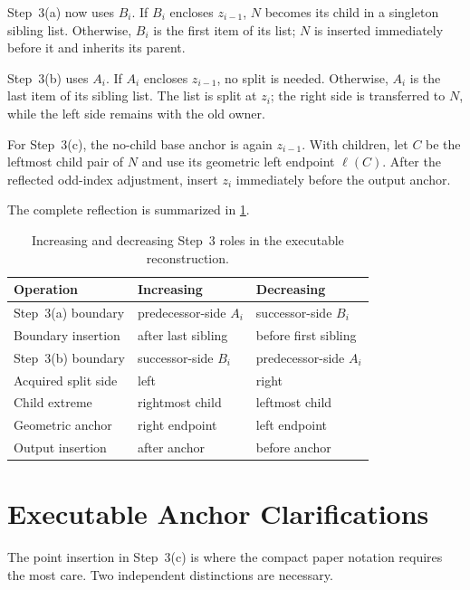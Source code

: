 Step~3(a) now uses $B_i$. If $B_i$ encloses $z_{i-1}$, $N$ becomes its child
in a singleton sibling list. Otherwise, $B_i$ is the first item of its list;
$N$ is inserted immediately before it and inherits its parent.

Step~3(b) uses $A_i$. If $A_i$ encloses $z_{i-1}$, no split is needed.
Otherwise, $A_i$ is the last item of its sibling list. The list is split at
$z_i$; the right side is transferred to $N$, while the left side remains with
the old owner.

For Step~3(c), the no-child base anchor is again $z_{i-1}$. With children, let
$C$ be the leftmost child pair of $N$ and use its geometric left endpoint
$\ell(C)$. After the reflected odd-index adjustment, insert $z_i$ immediately
before the output anchor.

The complete reflection is summarized in \cref{tab:algorithm-reflection}.
\begin{table}[htbp]
  \centering
  \caption{Increasing and decreasing Step~3 roles in the executable
  reconstruction.}
  \label{tab:algorithm-reflection}
  \begin{tabular}{lll}
    \toprule
    Operation & Increasing & Decreasing \\
    \midrule
    Step~3(a) boundary & predecessor-side $A_i$ & successor-side $B_i$ \\
    Boundary insertion & after last sibling & before first sibling \\
    Step~3(b) boundary & successor-side $B_i$ & predecessor-side $A_i$ \\
    Acquired split side & left & right \\
    Child extreme & rightmost child & leftmost child \\
    Geometric anchor & right endpoint & left endpoint \\
    Output insertion & after anchor & before anchor \\
    \bottomrule
  \end{tabular}
\end{table}

\section{Executable Anchor Clarifications}
\label{sec:algorithm-anchor-clarifications}

The point insertion in Step~3(c) is where the compact paper notation requires
the most care. Two independent distinctions are necessary.

